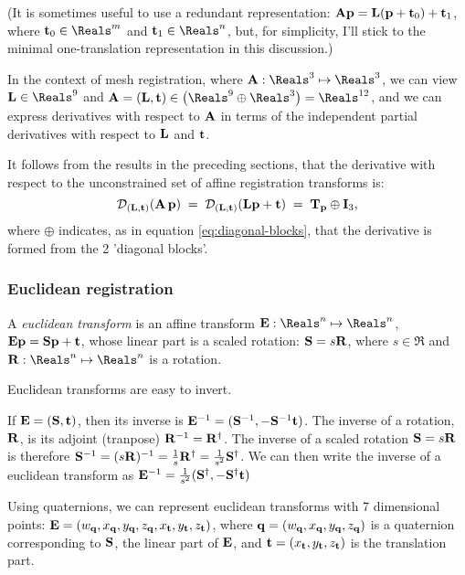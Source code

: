 (It is sometimes useful to use a redundant representation:
$\A \p = \L (\p + \t_0) + \t_1$,
where $\t_0 \in \Reals^m$ and $\t_1 \in \Reals^n$,
but, for simplicity, I'll stick to the minimal one-translation
representation in this discussion.)

In the context of mesh registration,
where $\A : \Reals^3 \mapsto \Reals^3$,
we can view $\L \in \Reals^9$ and
$\A = (\L, \t) \in \left(\Reals^9 \oplus \Reals^3 \right)= \Reals^{12}$,
and we can express derivatives with respect to $\A$
in terms of the independent partial derivatives
with respect to $\L$ and $\t$.

It follows from the results in the preceding sections,
that the derivative with respect to the
unconstrained set of affine registration transforms is:
\begin{equation}
\label{eq:affine-transform-derivative}
\Df{(\L,\t)}{\left( \A \, \p \right)}
 \; = \;
\Df{(\L,\t)}{\left( \L \p + \t \right)}
 \; = \;
\Tr_{\p} \oplus \I_3,
\end{equation}
where $\oplus$ indicates,
as in equation \ref{eq:diagonal-blocks},
that the derivative is formed from the 2
'diagonal blocks'.

\subsubsection{Euclidean registration}
\label{sec:euclidean-registration}

A {\it euclidean transform} is an affine transform
$\Eu : \Reals^n \mapsto \Reals^n$,
$\Eu \p = \Sc \p + \t $,
whose linear part is a scaled rotation:
$\Sc = s \R$,
where $s \in \Re$ and $\R : \Reals^n \mapsto \Reals^n$
is a rotation.

Euclidean transforms are easy to invert.

If $\Eu = (\Sc,\t)$, then its inverse is
$\Eu^{-1} = (\Sc^{-1}, - \Sc^{-1}\t)$.
The inverse of a rotation, $\R$, is its adjoint
(tranpose) $\R^{-1} = \R^{\dagger}$.
The inverse of a scaled rotation $\Sc = s \R$
is therefore
$\Sc^{-1} = (s \R)^{-1}
         = {1 \over s} \R^{\dagger}
         = {1 \over {s^2}} \Sc^{\dagger}$.
We can then write the inverse of a euclidean transform as
$\Eu^{-1} = {1 \over {s^2}}(\Sc^{\dagger}, - \Sc^{\dagger}\t)$

Using quaternions, we can represent euclidean transforms with
7 dimensional points:
$\Eu = (w_{\q}, x_{\q}, y_{\q}, z_{\q}, x_{\t}, y_{\t}, z_{\t})$,
where $\q = (w_{\q}, x_{\q}, y_{\q}, z_{\q})$ is a quaternion corresponding
to $\S$, the linear part of $\Eu$,
and $\t = (x_{\t}, y_{\t}, z_{\t})$ is the translation part.

